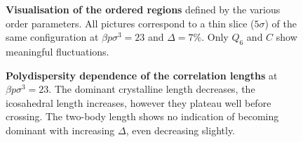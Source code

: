 \documentclass[twocolumn,superscriptaddress]{revtex4-1}
\begin{document}
\begin{figure}
	\caption{\textbf{Visualisation of the ordered regions} defined by the various order parameters. All pictures correspond to a thin slice ($5\sigma$) of the same configuration at $\beta p\sigma^3=23$ and $\Delta=7\%$. Only $Q_6$ and $C$ show meaningful fluctuations.}
	\label{fig:3D}
\end{figure}

\tikzset{external/force remake=false}
\begin{figure}
	\caption{\textbf{Polydispersity dependence of the correlation lengths} at $\beta p\sigma^3=23$. The dominant crystalline length decreases, the icosahedral length increases, however they plateau well before crossing. The two-body length shows no indication of becoming dominant with increasing $\Delta$, even decreasing slightly.}
	\label{fig:lengthpoly}
\end{figure}
\end{document}
